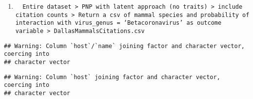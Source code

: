 \documentclass[
]{article}
\newenvironment{Shaded}{\begin{snugshade}}{\end{snugshade}}
\newcommand{\DataTypeTok}[1]{\textcolor[rgb]{0.13,0.29,0.53}{#1}}
\newcommand{\DecValTok}[1]{\textcolor[rgb]{0.00,0.00,0.81}{#1}}
\newcommand{\KeywordTok}[1]{\textcolor[rgb]{0.13,0.29,0.53}{\textbf{#1}}}
\newcommand{\NormalTok}[1]{#1}
\newcommand{\OperatorTok}[1]{\textcolor[rgb]{0.81,0.36,0.00}{\textbf{#1}}}
\newcommand{\OtherTok}[1]{\textcolor[rgb]{0.56,0.35,0.01}{#1}}
\newcommand{\StringTok}[1]{\textcolor[rgb]{0.31,0.60,0.02}{#1}}
\begin{document}
\begin{enumerate}
\def\labelenumi{\arabic{enumi}.}
\item
\begin{verbatim}
  Entire dataset > PNP with latent approach (no traits) > include citation counts > Return a csv of mammal species and probability of interaction with virus_genus = ‘Betacoronavirus’ as outcome variable > DallasMammalsCitations.csv
\end{verbatim}
\end{enumerate}

\begin{Shaded}
\end{Shaded}

\begin{verbatim}
## Warning: Column `host`/`name` joining factor and character vector, coercing into
## character vector
\end{verbatim}

\begin{verbatim}
## Warning: Column `host` joining factor and character vector, coercing into
## character vector
\end{verbatim}

\begin{Shaded}
\end{Shaded}
\end{document}
